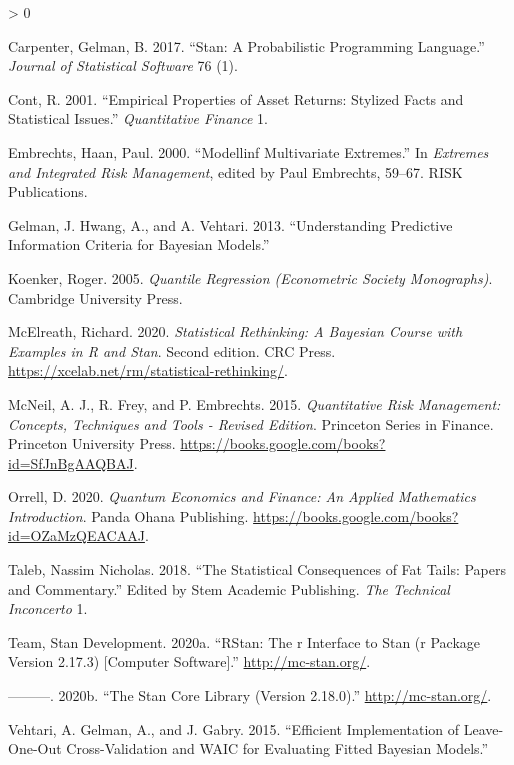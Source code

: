 \documentclass{article}
\newlength{\cslhangindent}
\newenvironment{CSLReferences}[2] %
 {%
  \setlength{\parindent}{0pt}
  \ifodd #1 \everypar{\setlength{\hangindent}{\cslhangindent}}\ignorespaces\fi
  \ifnum #2 > 0
  \setlength{\parskip}{#2\baselineskip}
  \fi
 }%
 {}
\begin{document}
\hypertarget{refs}{}
\begin{CSLReferences}{1}{0}
\leavevmode\hypertarget{ref-Carpenter2017}{}%
Carpenter, Gelman, B. 2017. {``Stan: A Probabilistic Programming
Language.''} \emph{Journal of Statistical Software} 76 (1).

\leavevmode\hypertarget{ref-Cont2001}{}%
Cont, R. 2001. {``Empirical Properties of Asset Returns: Stylized Facts
and Statistical Issues.''} \emph{Quantitative Finance} 1.

\leavevmode\hypertarget{ref-Embrechts2000}{}%
Embrechts, Haan, Paul. 2000. {``Modellinf Multivariate Extremes.''} In
\emph{Extremes and Integrated Risk Management}, edited by Paul
Embrechts, 59--67. RISK Publications.

\leavevmode\hypertarget{ref-GelmanHwangVehtari2013}{}%
Gelman, J. Hwang, A., and A. Vehtari. 2013. {``Understanding Predictive
Information Criteria for Bayesian Models.''}

\leavevmode\hypertarget{ref-Koenker2005}{}%
Koenker, Roger. 2005. \emph{Quantile Regression (Econometric Society
Monographs)}. Cambridge University Press.

\leavevmode\hypertarget{ref-McElreath2020}{}%
McElreath, Richard. 2020. \emph{Statistical Rethinking: {A Bayesian}
Course with Examples in {R} and {Stan}}. Second edition. {CRC Press}.
\url{https://xcelab.net/rm/statistical-rethinking/}.

\leavevmode\hypertarget{ref-mcneil2015quantitative}{}%
McNeil, A. J., R. Frey, and P. Embrechts. 2015. \emph{Quantitative Risk
Management: Concepts, Techniques and Tools - Revised Edition}. Princeton
Series in Finance. Princeton University Press.
\url{https://books.google.com/books?id=SfJnBgAAQBAJ}.

\leavevmode\hypertarget{ref-Orrell2020quantum}{}%
Orrell, D. 2020. \emph{Quantum Economics and Finance: An Applied
Mathematics Introduction}. Panda Ohana Publishing.
\url{https://books.google.com/books?id=OZaMzQEACAAJ}.

\leavevmode\hypertarget{ref-Taleb2018}{}%
Taleb, Nassim Nicholas. 2018. {``The Statistical Consequences of Fat
Tails: Papers and Commentary.''} Edited by Stem Academic Publishing.
\emph{The Technical Inconcerto} 1.

\leavevmode\hypertarget{ref-Stan2020a}{}%
Team, Stan Development. 2020a. {``RStan: The r Interface to Stan (r
Package Version 2.17.3) {[}Computer Software{]}.''}
\url{http://mc-stan.org/}.

\leavevmode\hypertarget{ref-Stan2020b}{}%
---------. 2020b. {``The Stan Core Library (Version 2.18.0).''}
\url{http://mc-stan.org/}.

\leavevmode\hypertarget{ref-VehtariGelmanGabry2015}{}%
Vehtari, A. Gelman, A., and J. Gabry. 2015. {``Efficient Implementation
of Leave-One-Out Cross-Validation and WAIC for Evaluating Fitted
Bayesian Models.''}

\end{CSLReferences}



\end{document}
